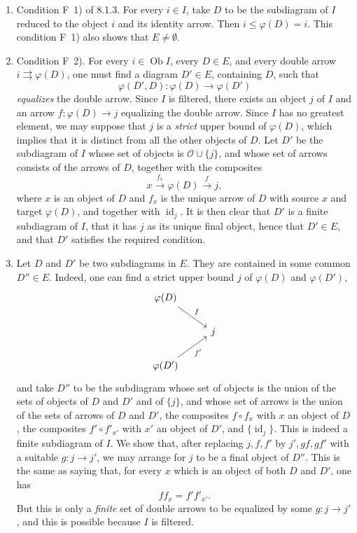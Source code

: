 \documentclass[11pt]{article}
\newcommand{\Ob}{\operatorname{Ob}}
\newcommand{\id}{\operatorname{id}}
\begin{document}
\begin{enumerate}[label=\arabic*)]
\item Condition F~1) of 8.1.3. For every $i\in I$, take $D$ to be the subdiagram of $I$ reduced to the object $i$ and its identity arrow. Then $i\leq \varphi(D)=i$. This condition F~1) also shows that $E\neq\emptyset$.

\item Condition F~2). For every $i\in\Ob I$, every $D\in E$, and every double arrow $i\rightrightarrows \varphi(D)$, one must find a diagram $D'\in E$, containing $D$, such that
\[
\varphi(D',D):\varphi(D)\longrightarrow\varphi(D')
\]
\emph{equalizes} the double arrow. Since $I$ is filtered, there exists an object $j$ of $I$ and an arrow $f:\varphi(D)\to j$ equalizing the double arrow. Since $I$ has no greatest element, we may suppose that $j$ is a \emph{strict} upper bound of $\varphi(D)$, which implies that it is distinct from all the other objects of $D$. Let $D'$ be the subdiagram of $I$ whose set of objects is $\mathcal O\cup\{j\}$, and whose set of arrows consists of the arrows of $D$, together with the composites
\[
x\xrightarrow{f_x}\varphi(D)\xrightarrow{f}j,
\]
where $x$ is an object of $D$ and $f_x$ is the unique arrow of $D$ with source $x$ and target $\varphi(D)$, and together with $\id_j$. It is then clear that $D'$ is a finite subdiagram of $I$, that it has $j$ as its unique final object, hence that $D'\in E$, and that $D'$ satisfies the required condition.

\item Let $D$ and $D'$ be two subdiagrams in $E$. They are contained in some common $D''\in E$. Indeed, one can find a strict upper bound $j$ of $\varphi(D)$ and $\varphi(D')$,
\[
\begin{tikzcd}[column sep=2.5em,row sep=1.8em]
\varphi(D) \arrow[dr,"f"] & \\
& j \\
\varphi(D') \arrow[ur,swap,"f'"] & {}
\end{tikzcd}
\]
and take $D''$ to be the subdiagram whose set of objects is the union of the sets of objects of $D$ and $D'$ and of $\{j\}$, and whose set of arrows is the union of the sets of arrows of $D$ and $D'$, the composites $f\circ f_x$ with $x$ an object of $D$, the composites $f'\circ f'_{x'}$ with $x'$ an object of $D'$, and $\{\id_j\}$. This is indeed a finite subdiagram of $I$. We show that, after replacing $j,f,f'$ by $j',gf,gf'$ with a suitable $g:j\to j'$, we may arrange for $j$ to be a final object of $D''$. This is the same as saying that, for every $x$ which is an object of both $D$ and $D'$, one has
\[
ff_x=f'f'_{x'}.
\]
But this is only a \emph{finite} set of double arrows to be equalized by some $g:j\to j'$, and this is possible because $I$ is filtered.
\end{enumerate}
\end{document}

